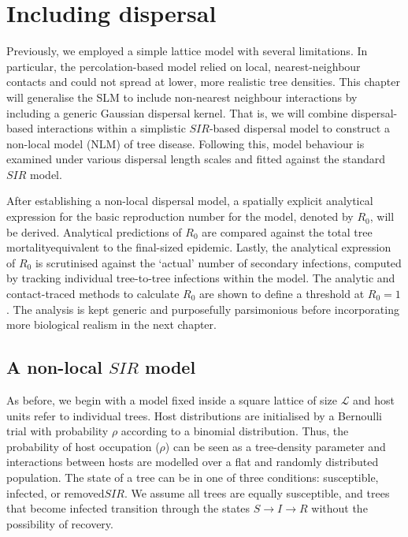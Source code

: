\chapter{Including dispersal}

\label{ch5:dispersal-model}
Previously, we employed a simple lattice model with several limitations. 
In particular, the percolation-based model relied on local, nearest-neighbour contacts and could not spread at lower, more realistic tree densities. 
This chapter will generalise the SLM to include non-nearest neighbour interactions by including a generic Gaussian dispersal kernel.
That is, we will combine dispersal-based interactions within a simplistic $SIR$-based dispersal model to construct a non-local model (NLM) of tree disease.
Following this, model behaviour is examined under various dispersal length scales and fitted against the standard $SIR$ model.

After establishing a non-local dispersal model, a spatially explicit analytical expression for the basic reproduction number for the model, denoted by $R_0$, will be derived.
Analytical predictions of $R_0$ are compared against the total tree mortality\textemdash equivalent to the final-sized epidemic.
Lastly, the analytical expression of $R_0$ is scrutinised against the `actual' number of secondary infections, computed by tracking individual tree-to-tree infections within the model.
The analytic and contact-traced methods to calculate $R_0$ are shown to define a threshold at $R_0=1$.
The analysis is kept generic and purposefully parsimonious before incorporating more biological realism in the next chapter. 

\section{A non-local $SIR$ model}
\label{section:sgm-expo}

As before, we begin with a model fixed inside a square lattice of size $\mathcal{L}$ and host units refer to individual trees.
Host distributions are initialised by a Bernoulli trial with probability $\rho$ according to a binomial distribution.
Thus, the probability of host occupation ($\rho$) can be seen as a tree-density parameter and interactions between hosts are modelled over a flat and randomly distributed population.
The state of a tree can be in one of three conditions: susceptible, infected, or removed\textemdash $SIR$.
We assume all trees are equally susceptible, and trees that become infected transition through the states $S\rightarrow I\rightarrow R$ without the possibility of recovery.

